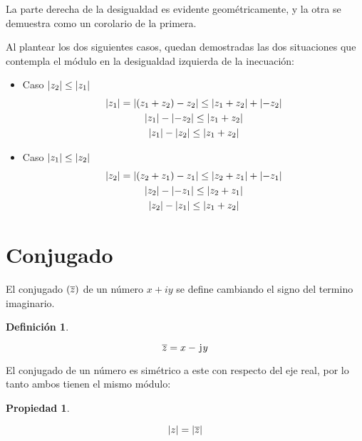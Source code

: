 \documentclass[a5paper,12pt,twoside]{book}
\newtheorem{defn}{{Definición}}[chapter]
\newtheorem{prop}{{Propiedad}}[chapter]
\begin{document}

La parte derecha de la desigualdad es evidente geométricamente, y la otra se demuestra como un corolario de la primera.

Al plantear los dos siguientes casos, quedan demostradas las dos situaciones que contempla el módulo en la desigualdad izquierda de la inecuación:

\begin{itemize}
    \item Caso ${\left| {z_2} \right|} \leq {\left| {z_1} \right|}$
    \begin{gather*}
        {\left| {z_1} \right|} = {\left| {(z_1+z_2)-z_2} \right|} \leq {\left| {z_1+z_2} \right|}+{\left| {-z_2} \right|}
        \\
        {\left| {z_1} \right|} - {\left| {-z_2} \right|} \leq {\left| {z_1+z_2} \right|}
        \\
        {\left| {z_1} \right|} - {\left| {z_2} \right|} \leq {\left| {z_1+z_2} \right|}
    \end{gather*}

    \item Caso ${\left| {z_1} \right|} \leq {\left| {z_2} \right|}$
    \begin{gather*}
        {\left| {z_2} \right|} = {\left| {(z_2+z_1)-z_1} \right|} \leq {\left| {z_2+z_1} \right|}+{\left| {-z_1} \right|}
        \\
        {\left| {z_2} \right|} - {\left| {-z_1} \right|} \leq {\left| {z_2+z_1} \right|}
        \\
        {\left| {z_2} \right|} - {\left| {z_1} \right|} \leq {\left| {z_1+z_2} \right|}
    \end{gather*}
\end{itemize}


\section{Conjugado}

El conjugado $(\overline{z})$ de un número $x+iy$ se define cambiando el signo del termino imaginario.

\begin{mdframed}[style=DefinitionFrame]
    \begin{defn}
        \label{defn:conjugate}
    \end{defn}
    \begin{equation*}
        \overline{z} = x - \mkern2mu\mathrm{j}\mkern1mu y
    \end{equation*}
\end{mdframed}

El conjugado de un número es simétrico a este con respecto del eje real, por lo tanto ambos tienen el mismo módulo:

\begin{mdframed}[style=PropertyFrame]
    \begin{prop}
    \end{prop}
    \begin{equation*}
        {\left| {z} \right|} = {\left| {\overline{z}} \right|}
    \end{equation*}
\end{mdframed}
\end{document}

